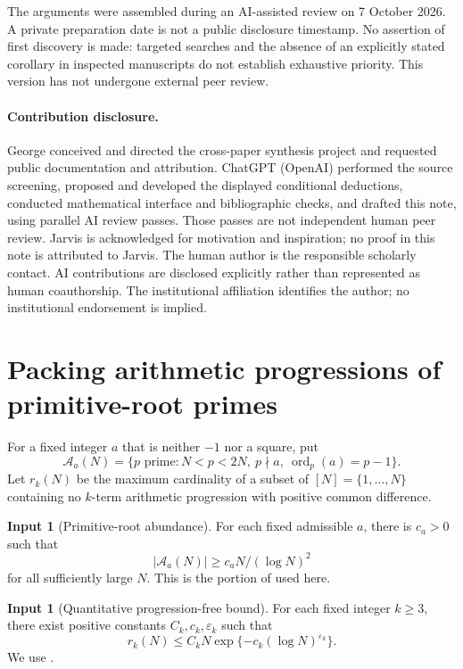 \documentclass[11pt]{article}
\theoremstyle{definition}
\newtheorem{assumption}[theorem]{Input}
\theoremstyle{remark}
\DeclareMathOperator{\ord}{ord}
\begin{document}
The arguments were assembled during an AI-assisted review on 7 October 2026. A private preparation date is not a public disclosure timestamp. No assertion of first discovery is made: targeted searches and the absence of an explicitly stated corollary in inspected manuscripts do not establish exhaustive priority. This version has not undergone external peer review.

\paragraph{Contribution disclosure.}
George conceived and directed the cross-paper synthesis project and requested public documentation and attribution. ChatGPT (OpenAI) performed the source screening, proposed and developed the displayed conditional deductions, conducted mathematical interface and bibliographic checks, and drafted this note, using parallel AI review passes. Those passes are not independent human peer review. Jarvis is acknowledged for motivation and inspiration; no proof in this note is attributed to Jarvis. The human author is the responsible scholarly contact. AI contributions are disclosed explicitly rather than represented as human coauthorship. The institutional affiliation identifies the author; no institutional endorsement is implied.

\section{Packing arithmetic progressions of primitive-root primes}\label{sec:packing}
For a fixed integer $a$ that is neither $-1$ nor a square, put
\[
\mathcal A_a(N)=\{p\text{ prime}:N<p<2N,\ p\nmid a,\ \ord_p(a)=p-1\}.
\]
Let $r_k(N)$ be the maximum cardinality of a subset of $[N]=\{1,\ldots,N\}$ containing no $k$-term arithmetic progression with positive common difference.

\begin{assumption}[Primitive-root abundance]\label{in:artin}
For each fixed admissible $a$, there is $c_a>0$ such that
\[|\mathcal A_a(N)|\ge c_aN/(\log N)^2\]
for all sufficiently large $N$. This is the portion of \cite[Theorem 1.1, p.~2]{artin} used here.
\end{assumption}
\begin{assumption}[Quantitative progression-free bound]\label{in:ap}
For each fixed integer $k\ge3$, there exist positive constants $C_k,c_k,\varepsilon_k$ such that
\[r_k(N)\le C_kN\exp\{-c_k(\log N)^{\varepsilon_k}\}.\]
We use \cite[Theorem 1.1, p.~4]{ap}.
\end{assumption}
\end{document}
